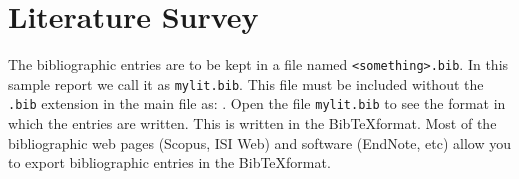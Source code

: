 
\chapter{Literature Survey}

The bibliographic entries are to be kept in a file named
\verb|<something>.bib|. In this sample report we call it as
\verb|mylit.bib|. This file must be included without the \verb|.bib|
extension in the main file as: \verb||.   Open the
file \verb|mylit.bib| to see the format in which the entries are
written. This is written in the Bib\TeX format. Most of the
bibliographic web pages (Scopus, ISI Web) and software (EndNote, etc)
allow you to export bibliographic entries in the Bib\TeX format.



